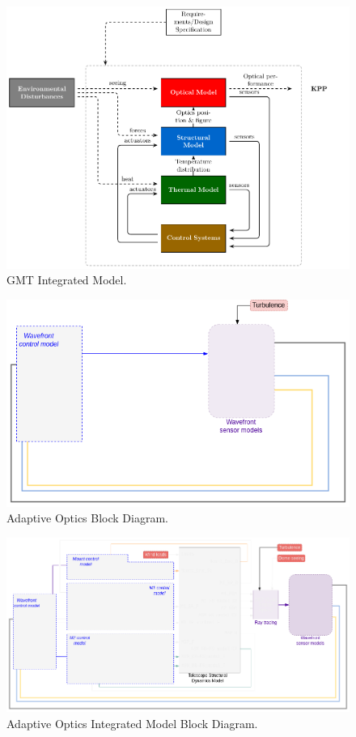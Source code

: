 \documentclass[]{AO4ELT}  %
\begin{document}
\begin{figure}
   \centering
   \includegraphics[width=0.9\linewidth]{integrated_modeling-bare.pdf}
   \caption{GMT Integrated Model.}
   \label{fig:2}
\end{figure}

\begin{figure}
   \centering
   \includegraphics[width=0.7\linewidth]{end2end_ngao-only.drawio.png}
   \caption{Adaptive Optics Block Diagram.}
   \label{fig:3}
\end{figure}

\begin{figure}
   \centering
   \includegraphics[width=\linewidth]{end2end_ngao-ngao-im-e2e.drawio.png}
   \caption{Adaptive Optics Integrated Model Block Diagram.}
   \label{fig:4}
\end{figure}
\end{document}
